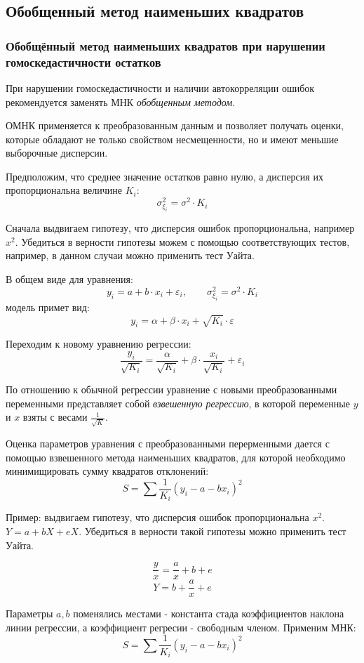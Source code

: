 \documentclass[aps,%
12pt,%
final,%
oneside,
onecolumn,%
musixtex, %
superscriptaddress,%
centertags]{article} %
\theoremstyle{plain}
\theoremstyle{definition}
\theoremstyle{remark}
\begin{document}
\newpage
\subsection{Обобщенный метод наименьших квадратов}

\subsubsection{Обобщённый метод наименьших квадратов при нарушении гомоскедастичности остатков}

При нарушении гомоскедастичности и наличии автокорреляции ошибок рекомендуется заменять МНК \textit{обобщенным методом}.

ОМНК применяется к преобразованным данным и позволяет получать оценки, которые обладают не только свойством несмещенности, но и имеют меньшие выборочные дисперсии.

Предположим, что среднее значение остатков равно нулю, а дисперсия их пропорциональна величине $K_i$:
$$\sigma_{\xi_i}^2 = \sigma^2 \cdot K_i$$

Сначала выдвигаем гипотезу, что дисперсия ошибок пропорциональна, например $x^2$. Убедиться в верности гипотезы можем с помощью соответствующих тестов, например, в данном случаи можно применить тест Уайта.

В общем виде для уравнения:
$$y_i = a + b \cdot x_i + \varepsilon_i, \qquad \sigma_{\xi_i}^2 = \sigma^2 \cdot K_i$$
модель примет вид:
$$y_i = \alpha + \beta \cdot x_i + \sqrt{K_i} \cdot \varepsilon$$

Переходим к новому уравнению регрессии:
$$\frac{y_i}{\sqrt{K_i}} = \frac{\alpha}{\sqrt{K_i}} + \beta \cdot \frac{x_i}{\sqrt{K_i}} + \varepsilon_i$$

По отношению к обычной регрессии уравнение с новыми преобразованными переменными представляет собой \textit{взвешенную регрессию}, в которой переменные $y$ и $x$ взяты с весами $\frac{1}{\sqrt{K}}$.

Оценка параметров уравнения с преобразованными перерменными дается с помощью взвешенного метода наименьших квадратов, для которой необходимо минимищировать сумму квадратов отклонений:
$$ S = \sum \frac{1}{K_i}(y_i - a - bx_i)^2$$


Пример: выдвигаем гипотезу, что дисперсия ошибок пропорциональна $x^2$. $Y=a+bX+eX$. Убедиться в верности такой гипотезы можно применить тест Уайта.

$$\frac{y}{x} = \frac{a}{x} + b + e$$
$$Y = b +\frac{a}{x} + e$$

Параметры $a,b$ поменялись местами - константа стада коэффициентов наклона линии регрессии, а коэффициент регресии - свободным членом.
Применим МНК:
$$ S = \sum \frac{1}{K_i}(y_i - a - bx_i)^2$$
\end{document}
